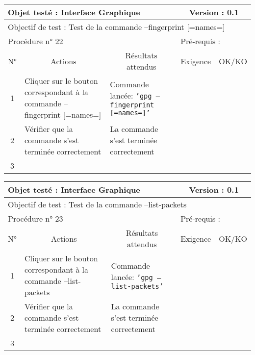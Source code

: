 \documentclass{../res/univ-projet}
\begin{document}
\begin{center}
\begin{tabular}{|c|p{5cm}|p{5cm}|p{1.5cm}|p{1.5cm}|}
\hline
\multicolumn{3}{|l|}{Objet testé : Interface Graphique} & \multicolumn{2}{c|}{Version : 0.1}\\ \hline
\multicolumn{5}{|l|}{Objectif de test : Test de la commande –fingerprint [=names=]}\\ \hline
\multicolumn{3}{|l|}{Procédure n° 22} & \multicolumn{2}{p{3cm}|}{Pré-requis : }\\ \hline
\multicolumn{1}{|c|}{N°} & \multicolumn{1}{c|}{Actions} & \multicolumn{1}{c|}{Résultats attendus} & 
\multicolumn{1}{c|}{Exigence} & \multicolumn{1}{c|}{OK/KO}\\ \hline
1 & Cliquer sur le bouton correspondant à la commande –fingerprint [=names=] & Commande lancée: \texttt{'gpg –fingerprint [=names=]'} &  & \\
2 & Vérifier que la commande s'est terminée correctement & La commande s'est terminée correctement &  & \\
3 &  &  &  & \\ \hline
\end{tabular}
\vskip 2.2cm


\begin{tabular}{|c|p{5cm}|p{5cm}|p{1.5cm}|p{1.5cm}|}
\hline
\multicolumn{3}{|l|}{Objet testé : Interface Graphique} & \multicolumn{2}{c|}{Version : 0.1}\\ \hline
\multicolumn{5}{|l|}{Objectif de test : Test de la commande –list-packets}\\ \hline
\multicolumn{3}{|l|}{Procédure n° 23} & \multicolumn{2}{p{3cm}|}{Pré-requis : }\\ \hline
\multicolumn{1}{|c|}{N°} & \multicolumn{1}{c|}{Actions} & \multicolumn{1}{c|}{Résultats attendus} & 
\multicolumn{1}{c|}{Exigence} & \multicolumn{1}{c|}{OK/KO}\\ \hline
1 & Cliquer sur le bouton correspondant à la commande –list-packets & Commande lancée: \texttt{'gpg –list-packets'} &  & \\
2 & Vérifier que la commande s'est terminée correctement & La commande s'est terminée correctement &  & \\
3 &  &  &  & \\ \hline
\end{tabular}
\vskip 2.2cm



\end{center}
\end{document}
